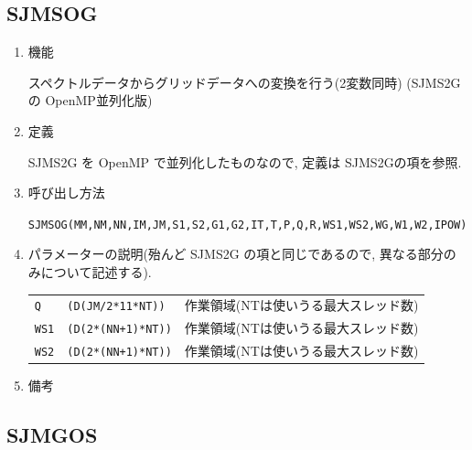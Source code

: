 \documentclass[a4j]{jarticle}
\begin{document}

\subsection{SJMSOG}

\begin{enumerate}

\item 機能 

スペクトルデータからグリッドデータへの変換を行う(2変数同時)
(SJMS2G の OpenMP並列化版)

\item 定義

SJMS2G を OpenMP で並列化したものなので, 定義は SJMS2Gの項を参照.

\item 呼び出し方法

{\tt SJMSOG(MM,NM,NN,IM,JM,S1,S2,G1,G2,IT,T,P,Q,R,WS1,WS2,WG,W1,W2,IPOW)}
  
\item パラメーターの説明(殆んど SJMS2G の項と同じであるので,
異なる部分のみについて記述する).

\begin{tabular}{lll}
{\tt Q} & {\tt (D(JM/2*11*NT))} & 作業領域(NTは使いうる最大スレッド数)\\
{\tt WS1} & {\tt (D(2*(NN+1)*NT))} & 作業領域(NTは使いうる最大スレッド数)\\
{\tt WS2} & {\tt (D(2*(NN+1)*NT))} & 作業領域(NTは使いうる最大スレッド数)
\end{tabular}

\item 備考

\end{enumerate}


\subsection{SJMGOS}
\end{document}
